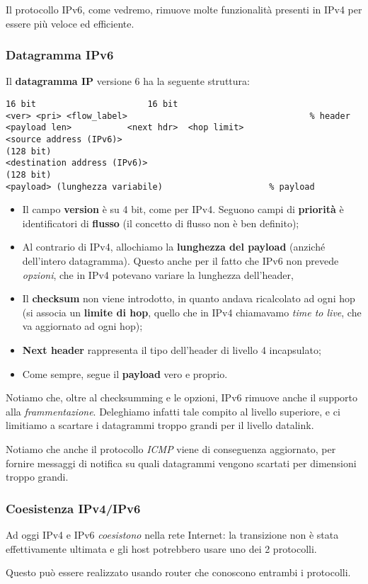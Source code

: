 \documentclass[a4paper,11pt]{article}
\begin{document}
Il protocollo IPv6, come vedremo, rimuove molte funzionalità presenti in IPv4 per essere più veloce ed efficiente.

\subsubsection{Datagramma IPv6}
Il \textbf{datagramma IP} versione 6 ha la seguente struttura:
\begin{lstlisting}[style=codestyle]	
16 bit						16 bit
<ver> <pri> <flow_label>									% header
<payload len>			<next hdr>	<hop limit>
<source address (IPv6)>
(128 bit)
<destination address (IPv6)>
(128 bit)
<payload> (lunghezza variabile)						% payload
\end{lstlisting}

\begin{itemize}
	\item Il campo \textbf{version} è su 4 bit, come per IPv4. Seguono campi di \textbf{priorità} è identificatori di \textbf{flusso} (il concetto di flusso non è ben definito);
	\item Al contrario di IPv4, allochiamo la \textbf{lunghezza del payload} (anziché dell'intero datagramma). Questo anche per il fatto che IPv6 non prevede \textit{opzioni}, che in IPv4 potevano variare la lunghezza dell'header,
	\item Il \textbf{checksum} non viene introdotto, in quanto andava ricalcolato ad ogni hop (si associa un \textbf{limite di hop}, quello che in IPv4 chiamavamo \textit{time to live}, che va aggiornato ad ogni hop);
	\item \textbf{Next header} rappresenta il tipo dell'header di livello 4 incapsulato;
	\item Come sempre, segue il \textbf{payload} vero e proprio.
\end{itemize}

Notiamo che, oltre al checksumming e le opzioni, IPv6 rimuove anche il supporto alla \textit{frammentazione}.
Deleghiamo infatti tale compito al livello superiore, e ci limitiamo a scartare i datagrammi troppo grandi per il livello datalink.

Notiamo che anche il protocollo \textit{ICMP} viene di conseguenza aggiornato, per fornire messaggi di notifica su quali datagrammi vengono scartati per dimensioni troppo grandi.

\subsubsection{Coesistenza IPv4/IPv6}
Ad oggi IPv4 e IPv6 \textit{coesistono} nella rete Internet: la transizione non è stata effettivamente ultimata e gli host potrebbero usare uno dei 2 protocolli.

Questo può essere realizzato usando router che conoscono entrambi i protocolli.
\end{document}
